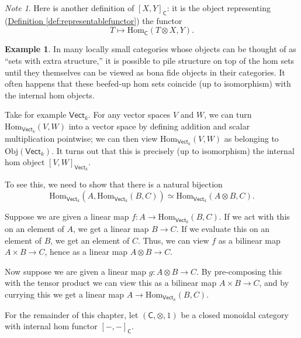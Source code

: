 \documentclass[a4paper]{report}
\newcommand{\Obj}{\mathrm{Obj}}
\newcommand{\Hom}{\mathrm{Hom}}
\theoremstyle{definition}
\newtheorem{example}{Example}[section]
\theoremstyle{plain}
\theoremstyle{remark}
\newtheorem{note}{Note}[section]
\begin{document}
\begin{note}
  Here is another definition of $[X, Y]_{\mathsf{C}}$: it is the object representing (\hyperref[def:representablefunctor]{Definition \ref*{def:representablefunctor}}) the functor
  \begin{equation*}
    T \mapsto \Hom_\mathsf{C}(T \otimes X, Y).
  \end{equation*}
\end{note}

\begin{example}
  In many locally small categories whose objects can be thought of as ``sets with extra structure,'' it is possible to pile structure on top of the hom sets until they themselves can be viewed as bona fide objects in their categories. It often happens that these beefed-up hom sets coincide (up to isomorphism) with the internal hom objects.

  Take for example $\mathsf{Vect}_{k}$. For any vector spaces $V$ and $W$, we can turn $\Hom_{\mathsf{Vect}_{k}}(V, W)$ into a vector space by defining addition and scalar multiplication pointwise; we can then view $\Hom_{\mathsf{Vect}_{k}}(V, W)$ as belonging to $\Obj(\mathsf{Vect}_{k})$. It turns out that this is precisely (up to isomorphism) the internal hom object $[V, W]_{\mathsf{Vect}_{k}}$.

  To see this, we need to show that there is a natural bijection 
  \begin{equation*}
    \Hom_{\mathsf{Vect}_{k}}(A, \Hom_{\mathsf{Vect}_{k}}(B, C)) \simeq \Hom_{\mathsf{Vect}_{k}}(A \otimes B, C).
  \end{equation*}

  Suppose we are given a linear map $f\colon A \to \Hom_{\mathsf{Vect}_{k}}(B, C)$. If we act with this on an element of $A$, we get a linear map $B \to C$. If we evaluate this on an element of $B$, we get an element of $C$. Thus, we can view $f$ as a bilinear map $A \times B \to C$, hence as a linear map $A \otimes B \to C$.

  Now suppose we are given a linear map $g\colon A \otimes B \to C$. By pre-composing this with the tensor product we can view this as a bilinear map $A \times B \to C$, and by currying this we get a linear map $A \to \Hom_{\mathsf{Vect}_{k}}(B, C)$.
\end{example}

For the remainder of this chapter, let $(\mathsf{C}, \otimes, 1)$ be a closed monoidal category with internal hom functor $[-,-]_{\mathsf{C}}$.
\end{document}
